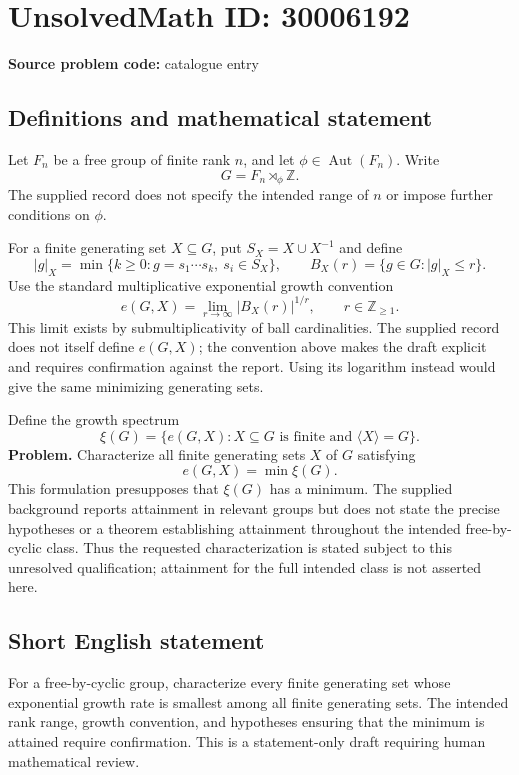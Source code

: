\documentclass[11pt]{article}
\newcommand{\Z}{\mathbb{Z}}
\begin{document}
\section*{UnsolvedMath ID: 30006192}
\textbf{Source problem code:} catalogue entry
\subsection{Definitions and mathematical statement}
Let \(F_n\) be a free group of finite rank \(n\), and let \(\phi\in\operatorname{Aut}(F_n)\). Write
\[
G=F_n\rtimes_\phi\Z.
\]
The supplied record does not specify the intended range of \(n\) or impose further conditions on \(\phi\).

For a finite generating set \(X\subseteq G\), put \(S_X=X\cup X^{-1}\) and define
\[
|g|_X=\min\{k\geq 0:g=s_1\cdots s_k,\ s_i\in S_X\},
\qquad
B_X(r)=\{g\in G:|g|_X\leq r\}.
\]
Use the standard multiplicative exponential growth convention
\[
e(G,X)=\lim_{r\to\infty}|B_X(r)|^{1/r},
\qquad r\in\Z_{\geq1}.
\]
This limit exists by submultiplicativity of ball cardinalities. The supplied record does not itself define \(e(G,X)\); the convention above makes the draft explicit and requires confirmation against the report. Using its logarithm instead would give the same minimizing generating sets.

Define the growth spectrum
\[
\xi(G)=\{e(G,X):X\subseteq G\text{ is finite and }\langle X\rangle=G\}.
\]
\textbf{Problem.} Characterize all finite generating sets \(X\) of \(G\) satisfying
\[
e(G,X)=\min\xi(G).
\]
This formulation presupposes that \(\xi(G)\) has a minimum. The supplied background reports attainment in relevant groups but does not state the precise hypotheses or a theorem establishing attainment throughout the intended free-by-cyclic class. Thus the requested characterization is stated subject to this unresolved qualification; attainment for the full intended class is not asserted here.
\subsection{Short English statement}
For a free-by-cyclic group, characterize every finite generating set whose exponential growth rate is smallest among all finite generating sets. The intended rank range, growth convention, and hypotheses ensuring that the minimum is attained require confirmation. This is a statement-only draft requiring human mathematical review.
\end{document}
